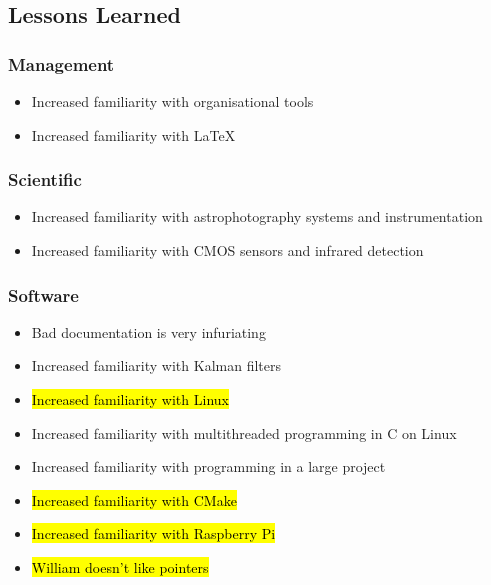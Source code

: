\pagebreak
\subsection{Lessons Learned}

\subsubsection{Management}

\begin{itemize}
    \item Increased familiarity with organisational tools
    \item Increased familiarity with LaTeX
\end{itemize}


\subsubsection{Scientific}

\begin{itemize}
    \item Increased familiarity with astrophotography systems and instrumentation
    \item Increased familiarity with CMOS sensors and infrared detection
\end{itemize}

\begin{comment}
\subsubsection{Electrical}

\begin{itemize}
    \item Friendship
    \item Sleep deprivation
\end{itemize}

\end{comment}
\subsubsection{Software}

\begin{itemize}
    \item Bad documentation is very infuriating
    \item Increased familiarity with Kalman filters
    \item \hl{Increased familiarity with Linux}
    \item Increased familiarity with multithreaded programming in C on Linux
    \item Increased familiarity with programming in a large project
    \item \hl{Increased familiarity with CMake}
    \item \hl{Increased familiarity with Raspberry Pi}
    \item \hl{William doesn't like pointers}
\end{itemize}

